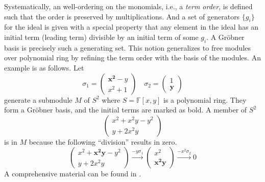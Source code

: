\documentclass[letterpaper,12pt]{amsart}
\theoremstyle{definition} \newtheorem{defn}{Definition}
\theoremstyle{definition} \newtheorem{rem}{Remark}
\theoremstyle{definition} \newtheorem{example}{Example}
\newcommand{\FF}{\mathbb{F}}
\begin{document}
Systematically, an well-ordering on the monomials, i.e., a \emph{term order}, is defined
such that the order is preserved by multiplications.
And a set of generators $\{ g_i \}$ for the ideal is given with a special property 
that any element in the ideal has an initial term (leading term)
divisible by an initial term of some $g_i$.
A Gr\"obner basis is precisely such a generating set.
This notion generalizes to free modules over polynomial ring by refining the term order with the basis of the modules.
An example is as follows. Let
\[
 \sigma_1 = 
 \begin{pmatrix}
  \mathbf{x^2} - y \\
  x^2 + 1
 \end{pmatrix} \quad
 \sigma_2 = 
 \begin{pmatrix}
  1 \\
  \mathbf{y}
 \end{pmatrix}
\]
generate a submodule $M$ of $S^2$ where $S = \FF[x,y]$ is a polynomial ring.
They form a Gr\"obner basis, and the initial terms are marked as bold.
A member of $S^2$
\[
 \begin{pmatrix}
 x^2 + x^2 y - y^2 \\
 y+2 x^2 y
 \end{pmatrix}
\]
is in $M$ because the following ``division'' results in zero.
\[
  \begin{pmatrix}
 x^2+\mathbf{x^2 y}-y^2 \\
 y+2 x^2 y
 \end{pmatrix}
 \xrightarrow{-y \sigma_1}
 \begin{pmatrix}
 x^2 \\
 \mathbf{x^2 y}
 \end{pmatrix}
 \xrightarrow{-x^2 \sigma_2} 0
\]
A comprehensive material can be found in \cite[Chapter~15]{Eisenbud}.
\end{document}
